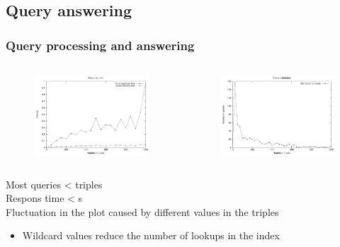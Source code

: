 \documentclass{beamer}
\begin{document}
\subsection{Query answering}

\begin{frame}
\frametitle{Query processing and answering}
\begin{columns}[T]
\centering
\begin{figure}
\includegraphics[scale=0.46]{imgs/qr_time_tot}
\end{figure}
\centering
\begin{figure}
\includegraphics[scale=0.46]{imgs/qr_tris_tot}
\end{figure}
\end{columns}
\bigskip
\scriptsize
Most queries \textless  {} triples\\
Respons time \textless  {} s\\
\bigskip
Fluctuation in the plot caused by different values in the triples
\begin{itemize}
\item Wildcard values reduce the number of lookups in the index
\end{itemize}
\bigskip
\end{frame}
\end{document}
